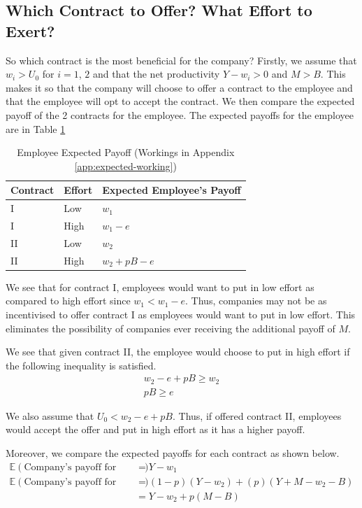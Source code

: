 \documentclass[a4paper, 12pt]{article}
\begin{document}
\subsection{Which Contract to Offer? What Effort to Exert?}

So which contract is the most beneficial for the company? Firstly, we assume that $w_i > U_0$ for $i=1$, $2$ and that the net productivity $Y-w_i> 0$ and $M > B$. This makes it so that the company will choose to offer a contract to the employee and that the employee will opt to accept the contract. We then compare the expected payoff of the 2 contracts for the employee. The expected payoffs for the employee are in Table \ref{tab:expected-payoff}

\begin{table}[H]
    \centering
    \begin{tabular}{p{}|p{}|p{}}
        Contract & Effort & Expected Employee's Payoff \\
        \hline
        I & Low & $w_1$ \\
        \hline
        I & High & $w_1 - e$ \\
        \hline
        II & Low & $w_2$ \\
        \hline
        II & High & $w_2 + pB - e$ \\
    \end{tabular}
    \caption{Employee Expected Payoff (Workings in Appendix \ref{app:expected-working})}
    \label{tab:expected-payoff}
\end{table}
We see that for contract I, employees would want to put in low effort as compared to high effort since $w_1 < w_1 - e$. Thus, companies may not be as incentivised to offer contract I as employees would want to put in low effort. This eliminates the possibility of companies ever receiving the additional payoff of $M$.

We see that given contract II, the employee would choose to put in high effort if the following inequality is satisfied.
\begin{align*}
    w_2 - e + pB \geq w_2 \\
    pB \geq e
\end{align*}

We also assume that $U_0 < w_2 - e + pB$. Thus, if offered contract II, employees would accept the offer and put in high effort as it has a higher payoff.

Moreover, we compare the expected payoffs for each contract as shown below.
\begin{align*}
    \mathbb{E}(\text{Company's payoff for offering contract I})& = Y-w_1 \\
    \mathbb{E}(\text{Company's payoff for offering contract II})& = (1-p)(Y-w_2) + (p)(Y+M-w_2-B)\\
    & = Y - w_2 + p(M - B)
\end{align*}
\end{document}
